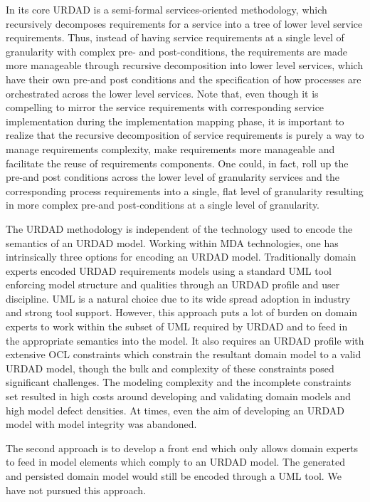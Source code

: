 In its core URDAD is a semi-formal services-oriented methodology, which recursively decomposes requirements for a service into a tree of lower level service requirements. Thus, instead of having service requirements at a single level of granularity with complex pre- and post-conditions, the requirements are made more manageable through recursive decomposition into lower level services, which have their own pre-and post conditions and the specification of how processes are orchestrated across the lower level services. Note that, even though it is compelling to mirror the service requirements with corresponding service implementation during the implementation mapping phase, it is important to realize that the recursive decomposition of service requirements is purely a way to manage requirements complexity, make requirements more manageable and facilitate the reuse of requirements components. One could, in fact, roll up the pre-and post conditions across the lower level of granularity services and the corresponding process requirements into a single, flat level of granularity resulting in more complex pre-and post-conditions at a single level of granularity.

The URDAD methodology is independent of the technology used to encode the semantics of an URDAD model. Working within MDA technologies, one has intrinsically three options for encoding an URDAD model. Traditionally domain experts encoded URDAD requirements models using a standard UML tool enforcing model structure and qualities through an URDAD profile and user discipline. UML is a natural choice due to its wide spread adoption in industry and strong tool support. However, this approach puts a lot of burden on domain experts to work within the subset of UML required by URDAD and to feed in the appropriate semantics into the model. It also requires an URDAD profile with extensive OCL constraints which constrain the resultant domain model to a valid URDAD model, though the bulk and complexity of these constraints posed significant challenges. The modeling complexity and the incomplete constraints set resulted in high costs around developing and validating domain models and high model defect densities. At times, even the aim of developing an URDAD model with model integrity was abandoned.

The second approach is to develop a front end which only allows domain experts to feed in model elements which comply to an URDAD model. The generated and persisted domain model would still be encoded through a UML tool. We have not pursued this approach.

